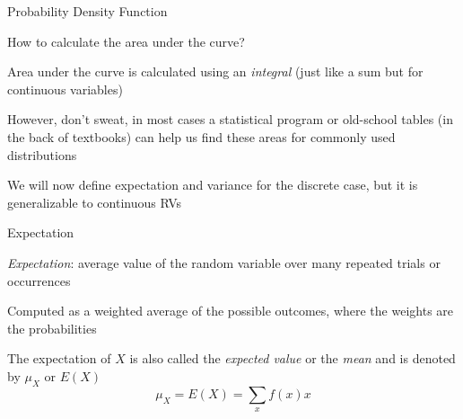 \documentclass{./../div_teaching_slides}
\begin{document}
\begin{frame}{Probability Density Function}
\vspace{1.5em}
\centering
{}
\end{frame}


\begin{frame}{How to calculate the area under the curve?}
\begin{witemize}
  \item Area under the curve is calculated using an \textit{integral} (just like a sum but for continuous variables)
  \item However, don't sweat, in most cases a statistical program or old-school tables (in the back of textbooks) can help us find these areas for commonly used distributions
  \item We will now define expectation and variance for the discrete case, but it is generalizable to continuous RVs
\end{witemize}
\end{frame}


\begin{frame}{Expectation}
\begin{witemize}
  \item \textit{Expectation}: average value of the random variable over many repeated trials or occurrences
  \item Computed as a weighted average of the possible outcomes, where the weights are the probabilities
  \item The expectation of $X$ is also called the \textit{expected value} or the \textit{mean} and is denoted by $\mu_X$ or $E(X)$
  $$ \mu_X = E(X) = \sum_x f(x) x $$
  \end{witemize}
\end{frame}
\end{document}

